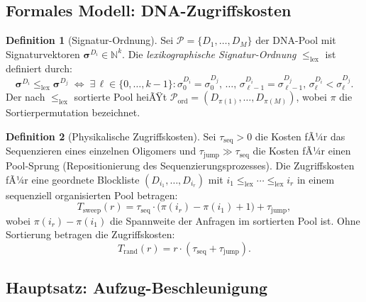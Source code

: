 ﻿\documentclass[a4paper,12pt]{article}
\theoremstyle{definition}
\newtheorem{definition}{Definition}[section]
\theoremstyle{plain}
\begin{document}
\subsection{Formales Modell: DNA-Zugriffskosten}
\label{ssec:elevator_modell}

\begin{definition}[Signatur-Ordnung]
\label{def:sig_ordnung}
  Sei $\mathcal{P} = \{D_1, \ldots, D_M\}$ der DNA-Pool mit
  Signaturvektoren $\boldsymbol{\sigma}^{D_i} \in \mathbb{N}^k$.
  Die \emph{lexikographische Signatur-Ordnung} $\le_{\mathrm{lex}}$ ist
  definiert durch:
  \[
    \boldsymbol{\sigma}^{D_i} \le_{\mathrm{lex}} \boldsymbol{\sigma}^{D_j}
    \;\Longleftrightarrow\;
    \exists\, \ell \in \{0, \ldots, k-1\}:
    \sigma_0^{D_i} = \sigma_0^{D_j},\, \ldots,\,
    \sigma_{\ell-1}^{D_i} = \sigma_{\ell-1}^{D_j},\,
    \sigma_\ell^{D_i} < \sigma_\ell^{D_j}.
  \]
  Der nach $\le_{\mathrm{lex}}$ sortierte Pool heiÃŸt
  $\mathcal{P}_{\mathrm{ord}} = (D_{\pi(1)}, \ldots, D_{\pi(M)})$,
  wobei $\pi$ die Sortierpermutation bezeichnet.
\end{definition}

\begin{definition}[Physikalische Zugriffskosten]
\label{def:zugriffskosten}
  Sei $\tau_{\mathrm{seq}} > 0$ die Kosten fÃ¼r das Sequenzieren eines
  einzelnen Oligomers und $\tau_{\mathrm{jump}} \gg \tau_{\mathrm{seq}}$
  die Kosten fÃ¼r einen Pool-Sprung (Repositionierung des
  Sequenzierungsprozesses).  Die Zugriffskosten fÃ¼r eine geordnete
  Blockliste $(D_{i_1}, \ldots, D_{i_r})$ mit
  $i_1 \le_{\mathrm{lex}} \cdots \le_{\mathrm{lex}} i_r$
  in einem sequenziell organisierten Pool betragen:
  \[
    T_{\mathrm{sweep}}(r)
    = \tau_{\mathrm{seq}} \cdot \bigl(\pi(i_r) - \pi(i_1) + 1\bigr)
      + \tau_{\mathrm{jump}},
  \]
  wobei $\pi(i_r) - \pi(i_1)$ die Spannweite der Anfragen im
  sortierten Pool ist.  Ohne Sortierung betragen die Zugriffskosten:
  \[
    T_{\mathrm{rand}}(r) = r \cdot (\tau_{\mathrm{seq}} + \tau_{\mathrm{jump}}).
  \]
\end{definition}

\subsection{Hauptsatz: Aufzug-Beschleunigung}
\label{ssec:elevator_satz}
\end{document}

